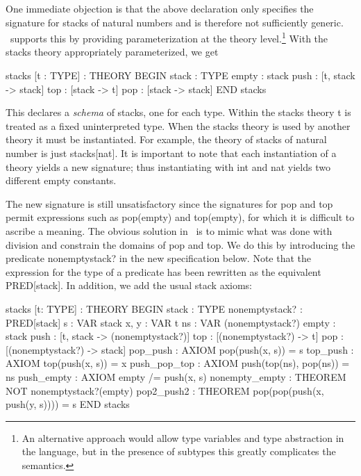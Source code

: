 One immediate objection is that the above declaration only specifies the
signature for stacks of natural numbers and is therefore not
sufficiently generic.  \pvs\ supports this by providing parameterization
at the theory level.\footnote{An alternative approach would allow type
variables and type abstraction in the language, but in the presence of
subtypes this greatly complicates the semantics.} With the {\stt stacks}
theory appropriately parameterized, we get
\begin{pvsexample}
  stacks [t : TYPE] : THEORY
   BEGIN
    stack : TYPE
    empty : stack
    push : [t, stack -> stack]
    top : [stack -> t]
    pop : [stack -> stack]
   END stacks
\end{pvsexample}
%
This declares a {\em schema\/} of stacks, one for each type.  Within the
{\stt stacks} theory {\stt t} is treated as a fixed uninterpreted type.
When the {\stt stacks} theory is used by another theory it must be
instantiated.  For example, the theory of stacks of natural number is
just {\stt stacks[nat]}.  It is important to note that each instantiation
of a theory yields a new signature; thus instantiating with {\stt int}
and {\stt nat} yields two different {\stt empty} constants.

The new signature is still unsatisfactory since the signatures for {\stt
pop} and {\stt top} permit expressions such as {\stt pop(empty)} and {\stt
top(empty)}, for which it is difficult to ascribe a meaning.  The
obvious solution in \pvs\ is to mimic what was done with division and
constrain the domains of {\stt pop} and {\stt top}.  We do this by
introducing the predicate {\stt nonemptystack?} in the new specification
below.  Note that the expression {} for the type of a
predicate has been rewritten as the equivalent {\stt PRED[stack]}.  In
addition, we add the usual stack axioms: \label{abstractstack}
\begin{pvsexample}
  stacks [t: TYPE] : THEORY 
   BEGIN
    stack : TYPE
    nonemptystack? : PRED[stack]
    s : VAR stack
    x, y : VAR t
    ns : VAR (nonemptystack?)
    empty : stack
    push : [t, stack -> (nonemptystack?)]
    top : [(nonemptystack?) -> t]
    pop : [(nonemptystack?) -> stack]
    pop_push : AXIOM pop(push(x, s)) = s
    top_push : AXIOM top(push(x, s)) = x
    push_pop_top : AXIOM  push(top(ns), pop(ns)) = ns
    push_empty : AXIOM empty /= push(x, s)
    nonempty_empty : THEOREM NOT nonemptystack?(empty)
    pop2_push2 : THEOREM pop(pop(push(x, push(y, s)))) = s   
   END stacks 
\end{pvsexample}

